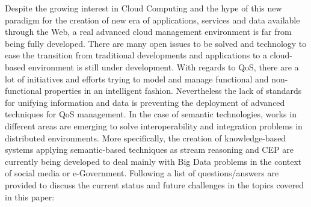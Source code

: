 Despite the growing interest in Cloud Computing and the hype of this 
new paradigm for the creation of new era of applications, services and data 
available through the Web, a real advanced cloud management environment is far 
from being fully developed. There are many open issues to be solved and 
technology to ease the transition from traditional developments and applications 
to a cloud-based environment is still under development. With regards to QoS, 
there are a lot of initiatives and efforts trying to model and manage functional 
and non-functional properties in an intelligent fashion. Nevertheless the lack 
of standards for unifying information and data is preventing the deployment of 
advanced techniques for QoS management. In the case of semantic technologies, 
works in different areas are emerging to solve interoperability and integration 
problems in distributed environments. More specifically, the creation of 
knowledge-based systems applying semantic-based techniques as stream reasoning 
and CEP are currently being developed to deal mainly with Big Data problems in the 
context of social media or e-Government. Following a list of questions/answers 
are provided to discuss the current status and future challenges in the 
topics covered in this paper:
